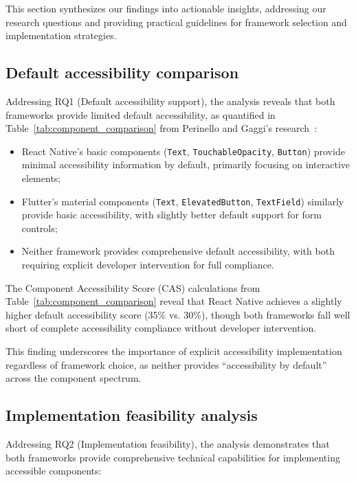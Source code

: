 This section synthesizes our findings into actionable insights, addressing our research questions and providing practical guidelines for framework selection and implementation strategies.

\subsection{Default accessibility comparison}
\label{subsec:default-accessibility}

Addressing RQ1 (Default accessibility support), the analysis reveals that both frameworks provide limited default accessibility, as quantified in Table~\ref{tab:component_comparison} from Perinello and Gaggi's research~\cite{perinello2024accessibility}:

\begin{itemize}
    \item React Native's basic components (\texttt{Text}, \texttt{TouchableOpacity}, \texttt{Button}) provide minimal accessibility information by default, primarily focusing on interactive elements;
    
    \item Flutter's material components (\texttt{Text}, \texttt{ElevatedButton}, \texttt{TextField}) similarly provide basic accessibility, with slightly better default support for form controls;
    
    \item Neither framework provides comprehensive default accessibility, with both requiring explicit developer intervention for full compliance.
\end{itemize}

The Component Accessibility Score (CAS) calculations from Table~\ref{tab:component_comparison} reveal that React Native achieves a slightly higher default accessibility score (35\% vs. 30\%), though both frameworks fall well short of complete accessibility compliance without developer intervention.

This finding underscores the importance of explicit accessibility implementation regardless of framework choice, as neither provides ``accessibility by default'' across the component spectrum.

\subsection{Implementation feasibility analysis}
\label{subsec:implementation-feasibility}

Addressing RQ2 (Implementation feasibility), the analysis demonstrates that both frameworks provide comprehensive technical capabilities for implementing accessible components:

